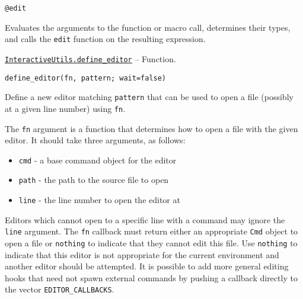 \begin{adjustwidth}{2em}{0pt}


\begin{verbatim}
@edit
\end{verbatim}

Evaluates the arguments to the function or macro call, determines their types, and calls the \texttt{edit} function on the resulting expression.



\end{adjustwidth}
\hypertarget{7329923191421757530}{}
\hyperlink{7329923191421757530}{\texttt{InteractiveUtils.define\_editor}}  -- {Function.}

\begin{adjustwidth}{2em}{0pt}


\begin{verbatim}
define_editor(fn, pattern; wait=false)
\end{verbatim}

Define a new editor matching \texttt{pattern} that can be used to open a file (possibly at a given line number) using \texttt{fn}.

The \texttt{fn} argument is a function that determines how to open a file with the given editor. It should take three arguments, as follows:

\begin{itemize}
\item \texttt{cmd} - a base command object for the editor


\item \texttt{path} - the path to the source file to open


\item \texttt{line} - the line number to open the editor at

\end{itemize}
Editors which cannot open to a specific line with a command may ignore the \texttt{line} argument. The \texttt{fn} callback must return either an appropriate \texttt{Cmd} object to open a file or \texttt{nothing} to indicate that they cannot edit this file. Use \texttt{nothing} to indicate that this editor is not appropriate for the current environment and another editor should be attempted. It is possible to add more general editing hooks that need not spawn external commands by pushing a callback directly to the vector \texttt{EDITOR\_CALLBACKS}.


\end{adjustwidth}
